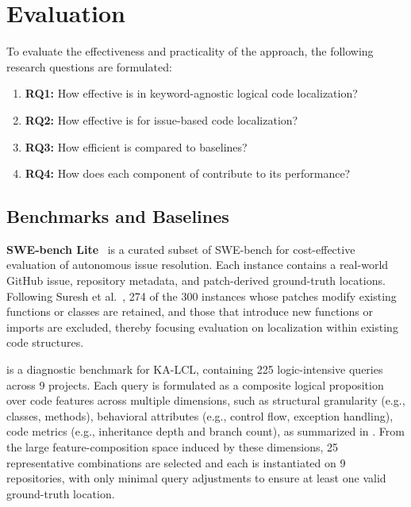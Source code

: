 \section{Evaluation}\label{sec:eval-dataloc}

To evaluate the effectiveness and practicality of the approach, the following research questions are formulated:
\begin{enumerate}
	\item \textbf{RQ1:} How effective is \tooldataloc in keyword-agnostic logical code localization?
	\item \textbf{RQ2:} How effective is \tooldataloc for issue-based code localization?
	\item \textbf{RQ3:} How efficient is \tooldataloc compared to baselines?
    \item \textbf{RQ4:} How does each component of \tooldataloc contribute to its performance?
\end{enumerate}

\subsection{Benchmarks and Baselines}\label{sec:eval:setup-dataloc}

\textbf{SWE-bench Lite}~\cite{swebench2024} is a curated subset of SWE-bench for cost-effective evaluation of autonomous issue resolution. Each instance contains a real-world GitHub issue, repository metadata, and patch-derived ground-truth locations. Following Suresh et al.~\cite{suresh2024cornstack}, 274 of the 300 instances whose patches modify existing functions or classes are retained, and those that introduce new functions or imports are excluded, thereby focusing evaluation on localization within existing code structures.

\textbf{\dataset} is a diagnostic benchmark for KA-LCL, containing 225 logic-intensive queries across 9 projects. Each query is formulated as a composite logical proposition over code features across multiple dimensions, such as structural granularity (e.g., classes, methods), behavioral attributes (e.g., control flow, exception handling), code metrics (e.g., inheritance depth and branch count), as summarized in . From the large feature-composition space induced by these dimensions, 25 representative combinations are selected and each is instantiated on 9 repositories, with only minimal query adjustments to ensure at least one valid ground-truth location.

